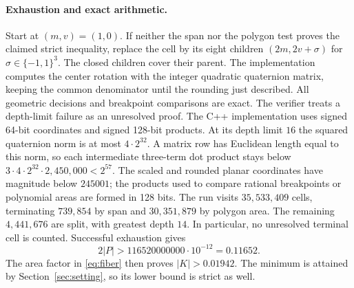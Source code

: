 \paragraph{Exhaustion and exact arithmetic.}
Start at $(m,v)=(1,0)$. If neither the span nor the polygon test proves
the claimed strict inequality, replace the cell by its eight children
$(2m,2v+\sigma)$ for $\sigma\in\{-1,1\}^3$. The closed children
cover their parent. The implementation computes the center rotation with
the integer quadratic quaternion matrix, keeping the common denominator
until the rounding just described. All geometric decisions and
breakpoint comparisons are exact. The verifier treats a depth-limit
failure as an unresolved proof. The C++ implementation uses signed 64-bit coordinates and signed 128-bit products. At its depth limit $16$ the squared quaternion norm is at most $4\cdot 2^{32}$. A matrix row has Euclidean length equal to this norm, so each intermediate three-term dot product stays below $3\cdot 4\cdot 2^{32}\cdot2{,}450{,}000<2^{57}$. The scaled and rounded planar coordinates have magnitude below $245001$; the products used to compare rational breakpoints or polynomial areas are formed in 128 bits. The run visits $35{,}533{,}409$ cells, terminating $739{,}854$ by span
and $30{,}351{,}879$ by polygon area. The remaining $4{,}441{,}676$
are split, with greatest depth $14$. In particular, no unresolved terminal
cell is counted. Successful exhaustion gives
\[
        2|P|>116520000000\cdot10^{-12}=0.11652.
\]
The area factor in \eqref{eq:fiber} then proves $|K|>0.01942$.
The minimum is attained by Section~\ref{sec:setting}, so its lower bound
is strict as well.
